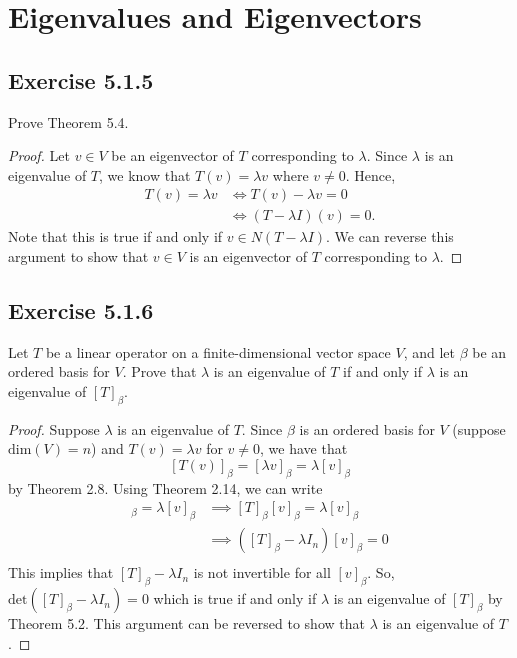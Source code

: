 \section{Eigenvalues and Eigenvectors}

\subsection*{Exercise 5.1.5} Prove Theorem 5.4. 
\begin{proof}
Let \( v \in V  \) be an eigenvector of \( T  \) corresponding to \( \lambda  \). Since \( \lambda  \) is an eigenvalue of \( T \), we know that \( T(v) = \lambda v  \) where \( v \neq 0  \). Hence,  
\begin{align*}
    T(v) = \lambda v &\iff T(v) - \lambda v = 0  \\
                     &\iff (T - \lambda I)(v) = 0. 
\end{align*}
Note that this is true if and only if \( v \in N(T - \lambda I)  \). We can reverse this argument to show that \( v \in V  \) is an eigenvector of \( T  \) corresponding to \( \lambda  \).
\end{proof}


\subsection*{Exercise 5.1.6} Let \( T  \) be a linear operator on a finite-dimensional vector space \( V  \), and let \( \beta  \) be an ordered basis for \( V  \). Prove that \( \lambda  \) is an eigenvalue of \( T  \) if and only if \( \lambda  \) is an eigenvalue of \( [T]_{\beta} \).
\begin{proof}
Suppose \( \lambda  \) is an eigenvalue of \( T  \). Since \( \beta  \) is an ordered basis for \( V  \) (suppose \( \text{dim}(V) = n  \)) and \( T(v) = \lambda v  \) for \( v \neq 0  \), we have that
\[ [T(v)]_{\beta} =  [\lambda v ]_{\beta} = \lambda [v]_{\beta}  \]
by Theorem 2.8. Using Theorem 2.14, we can write 
\begin{align*}
    [T(v)]_{\beta } = \lambda [v]_{\beta} &\implies [T]_{\beta } [v]_{\beta } = \lambda [v]_{\beta}  \\
                                          &\implies ([T]_{\beta} - \lambda {I}_{n}) [v]_{\beta} = 0 \\
\end{align*}
This implies that \( [T]_{\beta} - \lambda {I}_{n} \) is not invertible for all \( [v]_{\beta} \). So, \( \text{det}([T]_{\beta} - \lambda {I}_{n}) = 0  \) which is true if and only if \( \lambda  \) is an eigenvalue of \( [T]_{\beta} \) by Theorem 5.2. This argument can be reversed to show that \( \lambda  \) is an eigenvalue of \( T  \).
\end{proof}

